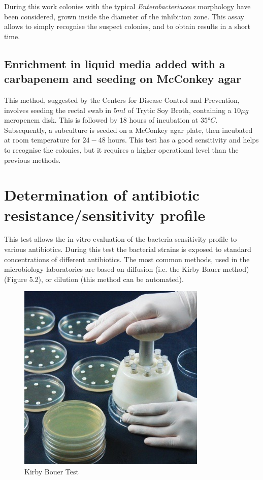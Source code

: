 \documentclass[11pt]{report}
\begin{document}
During this work colonies with the typical \emph{Enterobacteriaceae} morphology have been considered, grown inside the diameter of the inhibition zone.
This assay allows to simply recognise the suspect colonies, and to obtain results in a short time. 

\subsection{Enrichment in liquid media added with a carbapenem and seeding on McConkey agar}

This method, suggested by the Centers for Disease Control and Prevention, involves seeding the rectal swab in $5ml$ of Trytic Soy Broth, containing a $10\mu g$ meropenem disk.
This is followed by 18 hours of incubation at $35°C$.
Subsequently, a subculture is seeded on a McConkey agar plate, then incubated at room temperature for $24-48$ hours.
This test has a good sensitivity and helps to recognise the colonies, but it requires a higher operational level than the previous methods.

\section{Determination of antibiotic resistance/sensitivity profile}
This test allows the in vitro evaluation of the bacteria sensitivity profile to various antibiotics.
During this test the bacterial strains is exposed to standard concentrations of different antibiotics.
The most common methods, used in the microbiology laboratories are based on diffusion (i.e. the Kirby Bauer method) (Figure 5.2), or dilution (this method can be automated).

\begin{figure}[htp]
\centering
\includegraphics[scale=0.800]{img/Kirby_Bouer.jpg}
\caption{Kirby Bouer Test}
\label{}
\end{figure}
\end{document}
